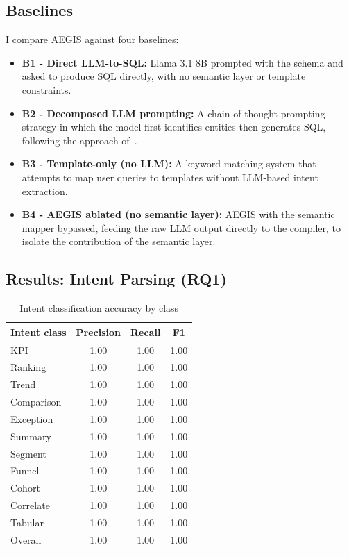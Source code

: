\documentclass[11pt]{article}
\begin{document}
\subsection{Baselines}
I compare AEGIS against four baselines:
\begin{itemize}
  \item \textbf{B1 - Direct LLM-to-SQL:} Llama 3.1 8B prompted with the schema and asked to produce SQL directly, with no semantic layer or template constraints.
  \item \textbf{B2 - Decomposed LLM prompting:} A chain-of-thought prompting strategy in which the model first identifies entities then generates SQL, following the approach of~\cite{su2026trisql}.
  \item \textbf{B3 - Template-only (no LLM):} A keyword-matching system that attempts to map user queries to templates without LLM-based intent extraction.
  \item \textbf{B4 - AEGIS ablated (no semantic layer):} AEGIS with the semantic mapper bypassed, feeding the raw LLM output directly to the compiler, to isolate the contribution of the semantic layer.
\end{itemize}

\subsection{Results: Intent Parsing (RQ1)}
\begin{longtable}{lccc}
\toprule
\textbf{Intent class} & \textbf{Precision} & \textbf{Recall} & \textbf{F1}\\
\midrule
KPI & 1.00 & 1.00 & 1.00\\
Ranking & 1.00 & 1.00 & 1.00\\
Trend & 1.00 & 1.00 & 1.00\\
Comparison & 1.00 & 1.00 & 1.00\\
Exception & 1.00 & 1.00 & 1.00\\
Summary & 1.00 & 1.00 & 1.00\\
Segment & 1.00 & 1.00 & 1.00\\
Funnel & 1.00 & 1.00 & 1.00\\
Cohort & 1.00 & 1.00 & 1.00\\
Correlate & 1.00 & 1.00 & 1.00\\
Tabular & 1.00 & 1.00 & 1.00\\
\midrule
Overall & 1.00 & 1.00 & 1.00\\
\bottomrule
\caption{Intent classification accuracy by class}\label{tab:intent}
\end{longtable}
\end{document}
